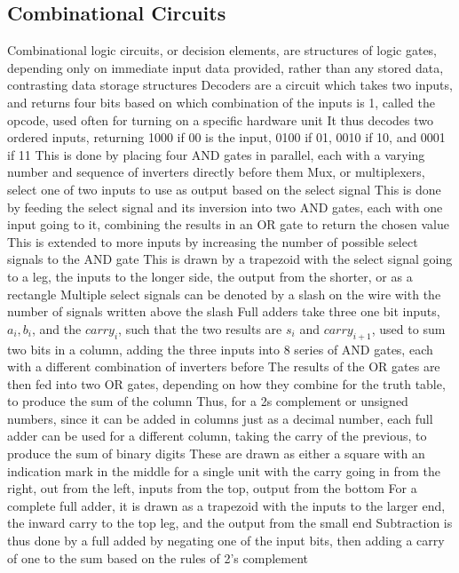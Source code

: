 \documentclass[11 pt, twoside]{article}
\newenvironment{outline*}
{
	\begin{outline}[enumerate]
	}
	{\end{outline}
}
\begin{document}
\subsection{Combinational Circuits}
\begin{outline*}
\1 Combinational logic circuits, or decision elements, are structures of logic gates, depending only on immediate input data provided, rather than any stored data, contrasting data storage structures
\2 Decoders are a circuit which takes two inputs, and returns four bits based on which combination of the inputs is 1, called the opcode, used often for turning on a specific hardware unit
\3 It thus decodes two ordered inputs, returning 1000 if 00 is the input, 0100 if 01, 0010 if 10, and 0001 if 11
\3 This is done by placing four AND gates in parallel, each with a varying number and sequence of inverters directly before them
\2 Mux, or multiplexers, select one of two inputs to use as output based on the select signal
\3 This is done by feeding the select signal and its inversion into two AND gates, each with one input going to it, combining the results in an OR gate to return the chosen value
\3 This is extended to more inputs by increasing the number of possible select signals to the AND gate
\3 This is drawn by a trapezoid with the select signal going to a leg, the inputs to the longer side, the output from the shorter, or as a rectangle
\4 Multiple select signals can be denoted by a slash on the wire with the number of signals written above the slash
\2 Full adders take three one bit inputs, $a_i, b_i$, and the $carry_i$, such that the two results are $s_i$ and $carry_{i + 1}$, used to sum two bits in a column, adding the three inputs into 8 series of AND gates, each with a different combination of inverters before
\3 The results of the OR gates are then fed into two OR gates, depending on how they combine for the truth table, to produce the sum of the column
\3 Thus, for a 2s complement or unsigned numbers, since it can be added in columns just as a decimal number, each full adder can be used for a different column, taking the carry of the previous, to produce the sum of binary digits
\3 These are drawn as either a square with an indication mark in the middle for a single unit with the carry going in from the right, out from the left, inputs from the top, output from the bottom
\4 For a complete full adder, it is drawn as a trapezoid with the inputs to the larger end, the inward carry to the top leg, and the output from the small end
\3 Subtraction is thus done by a full added by negating one of the input bits, then adding a carry of one to the sum based on the rules of 2's complement

\end{outline*}
\end{document}
